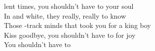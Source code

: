 lent times,\songwordfb{} 
you shouldn't have to  your soul\songwordfb{} \\
In  and white,\songwordfb{} they really, really  to know \songwordfb{} \\
Those -track minds \songwordfb{} that took you for a king boy \songwordfb{}\\
Kiss  goodbye, \songwordfb{} you shouldn't have to  for joy \songwordfb{}\\
You shouldn't have to  

